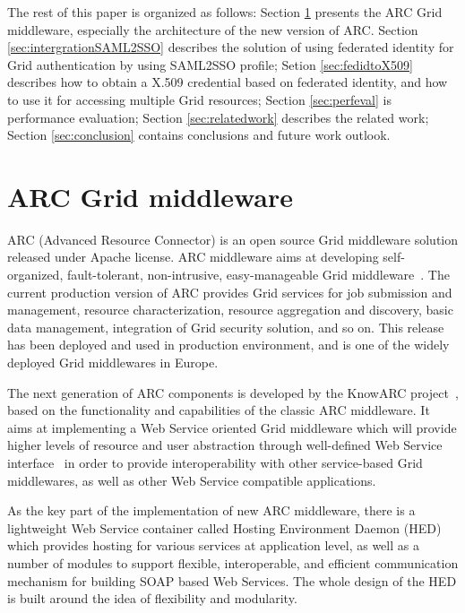\documentclass[conference]{IEEEtran}
\begin{document}
The rest of this paper is organized as follows: Section \ref{sec:arcmiddleware} presents the 
ARC Grid middleware, especially the architecture of the new version of ARC. Section 
\ref{sec:intergrationSAML2SSO} describes the solution of using federated identity for 
Grid authentication by using SAML2SSO profile; Setion \ref{sec:fedidtoX509} describes
how to obtain a X.509 credential based on federated identity, and how to use it for 
accessing multiple Grid resources; Section \ref{sec:perfeval} is performance evaluation;
Section \ref{sec:relatedwork} describes the related work; Section \ref{sec:conclusion} 
contains conclusions and future work outlook.

\section{ARC Grid middleware}
\label{sec:arcmiddleware}

ARC (Advanced Resource Connector) is an open source Grid middleware solution released under Apache license. ARC middleware aims at developing self-organized, fault-tolerant, non-intrusive, easy-manageable Grid middleware~\cite{MEllert07}. The current production version of ARC provides Grid services for job submission and management, resource characterization, resource aggregation and discovery, basic data management, integration of Grid security solution, and so on. This release has been deployed and used in production environment, and is one of the widely deployed Grid middlewares in Europe.

The next generation of ARC components is developed by the KnowARC project~\cite{KnowARClink}, based on the functionality and capabilities of the classic ARC middleware. It aims at implementing a Web Service oriented Grid middleware which will provide higher levels of resource and user abstraction through well-defined Web Service interface~\cite{KnowARCDesignlink} in order to provide interoperability with other service-based Grid middlewares, as well as other Web Service compatible applications.

As the key part of the implementation of new ARC middleware, there is a lightweight Web Service container called Hosting Environment Daemon (HED) which provides hosting for various services at application level, as well as a number of modules to support flexible, interoperable, and efficient communication mechanism for building SOAP based Web Services. The whole design of the HED is built around the idea of flexibility and modularity.
\end{document}
